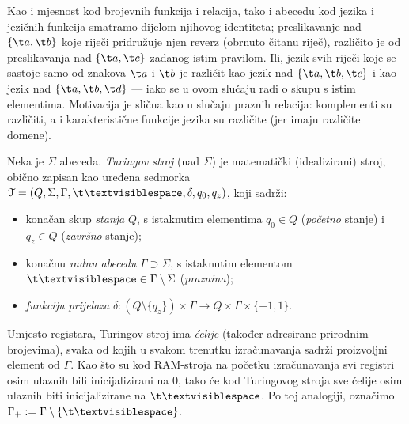 \begin{napomena}[{name=[abeceda je dio identiteta jezične funkcije]}]
Kao i mjesnost kod brojevnih funkcija i relacija, tako i abecedu kod jezika i jezičnih funkcija smatramo dijelom njihovog identiteta; preslikavanje nad $\{\t a,\t b\}$ koje riječi pridružuje njen reverz (obrnuto čitanu riječ), različito je od preslikavanja nad $\{\t a,\t c\}$ zadanog istim pravilom. Ili, jezik svih riječi koje se sastoje samo od znakova $\t a$ i $\t b$ je različit kao jezik nad $\{\t a,\t b,\t c\}$ i kao jezik nad $\{\t a,\t b,\t d\}$ --- iako se u ovom slučaju radi o skupu s istim elementima. Motivacija je slična kao u slučaju praznih relacija: komplementi su različiti, a i karakteristične funkcije jezika su različite (jer imaju različite domene).
\end{napomena}

\begin{definicija}[{name=[Turingov stroj]}]
Neka je $\Sigma$ abeceda. \emph{Turingov stroj} (nad $\Sigma$) je matematički (idealizirani) stroj, obično zapisan kao uređena sedmorka $\mathcal T=(Q,\Sigma,\Gamma,\bl,\delta,q_0,q_z)$, koji sadrži:
\begin{itemize}
    \item konačan skup \emph{stanja} $Q$, s istaknutim elementima $q_0\in Q$ (\emph{početno} stanje) i $q_z\in Q$ (\emph{završno} stanje);
    \item konačnu \emph{radnu abecedu} $\Gamma\supset\Sigma$, s istaknutim elementom $\bl\in\Gamma\setminus\Sigma$ (\emph{praznina});
    \item \emph{funkciju prijelaza} $\delta\colon(Q\setminus\{q_z\})\times\Gamma\to Q\times\Gamma\times\{-1,1\}$.\qedhere
\end{itemize}
\end{definicija}

Umjesto registara, Turingov stroj ima \emph{ćelije} (također adresirane prirodnim brojevima), svaka od kojih u svakom trenutku izračunavanja sadrži proizvoljni element od $\Gamma$. Kao što su kod RAM-stroja na početku izračunavanja svi registri osim ulaznih bili inicijalizirani na $0$, tako će kod Turingovog stroja sve ćelije osim ulaznih biti inicijalizirane na $\bl$. Po toj analogiji, označimo $\Gamma_+:=\Gamma\setminus\{\bl\}$.

